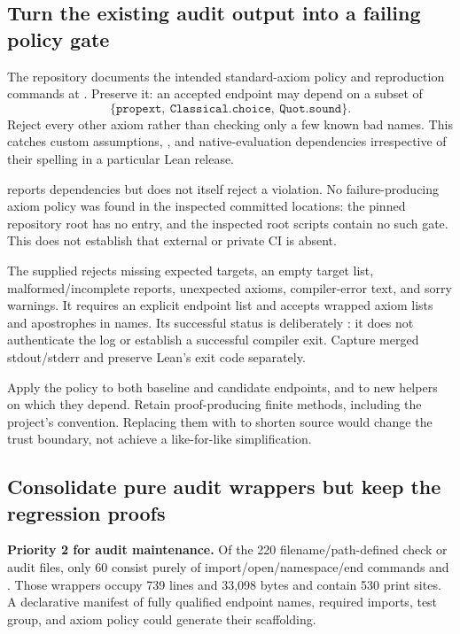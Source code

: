 \subsection{Turn the existing audit output into a failing policy gate}
\label{sec:axiomgate}

The repository documents the intended standard-axiom policy and reproduction
commands at . Preserve it: an accepted endpoint
may depend on a subset of
\[
 \{\texttt{propext},\ \texttt{Classical.choice},\ \texttt{Quot.sound}\}.
\]
Reject every other axiom rather than checking only a few known bad names.
This catches custom assumptions, , and native-evaluation
dependencies irrespective of their spelling in a particular Lean release.

 reports dependencies but does not itself reject a
violation. No failure-producing axiom policy was found in the inspected
committed locations: the pinned repository root has no 
entry, and the inspected root scripts contain no such gate. This does not
establish that external or private CI is absent.

The supplied  rejects missing
expected targets, an empty target list, malformed/incomplete reports,
unexpected axioms, compiler-error text, and sorry warnings. It requires an
explicit endpoint list and accepts wrapped axiom lists and apostrophes in
names. Its successful status is deliberately : it
does not authenticate the log or establish a successful compiler exit.
Capture merged stdout/stderr and preserve Lean's exit code separately.

Apply the policy to both baseline and candidate endpoints, and to new helpers
on which they depend. Retain proof-producing finite methods, including the
project's  convention. Replacing them with
 to shorten source would change the trust boundary,
not achieve a like-for-like simplification.

\subsection{Consolidate pure audit wrappers but keep the regression proofs}

\textbf{Priority 2 for audit maintenance.} Of the 220 filename/path-defined
check or audit files, only 60 consist purely of import/open/namespace/end
commands and . Those wrappers occupy 739 lines and
33,098 bytes and contain 530 print sites. A declarative manifest of fully
qualified endpoint names, required imports, test group, and axiom policy
could generate their scaffolding.

